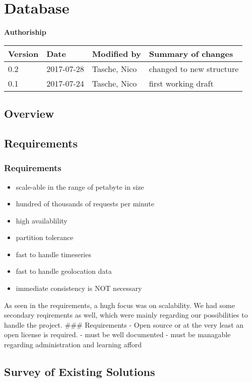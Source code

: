 \section{Database}\label{database}

\textbf{Authoriship}

\begin{longtable}[]{@{}llll@{}}
\toprule
Version & Date & Modified by & Summary of changes\tabularnewline
\midrule
\endhead
0.2 & 2017-07-28 & Tasche, Nico & changed to new
structure\tabularnewline
0.1 & 2017-07-24 & Tasche, Nico & first working draft\tabularnewline
\bottomrule
\end{longtable}

\subsection{Overview}\label{overview}

\subsection{Requirements}\label{requirements}

\subsubsection{Requirements}\label{requirements-1}

\begin{itemize}
\tightlist
\item
  scale-able in the range of petabyte in size
\item
  hundred of thousands of requests per minute
\item
  high availablility
\item
  partition tolerance
\item
  fast to handle timeseries
\item
  fast to handle geolocation data
\item
  immediate consistency is NOT necessary
\end{itemize}

As seen in the requirements, a hugh focus was on scalability. We had
some secondary reqirements as well, which were mainly regarding our
possibilities to handle the project. \#\#\# Requirements - Open source
or at the very least an open license is required. - must be well
documented - must be managable regarding administration and learning
afford

\subsection{Survey of Existing
Solutions}\label{survey-of-existing-solutions}

